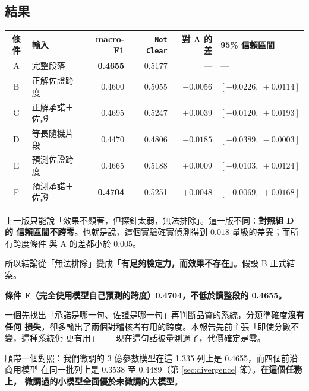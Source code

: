 \documentclass[11pt,a4paper]{ctexart}
\newcommand{\fn}[1]{\texttt{#1}}
\begin{document}
\subsection{結果}

\begin{table}[h]
\centering\small
\begin{tabular}{@{}clrrrl@{}}
\toprule
條件 & 輸入 & macro-F1 & \fn{Not Clear} & 對 A 的差 & 95\% 信賴區間 \\
\midrule
A & 完整段落 & \textbf{0.4655} & 0.5177 & — & — \\
B & 正解佐證跨度 & 0.4600 & 0.5055 & $-0.0056$ & $[-0.0226,\ +0.0114]$ \\
C & 正解承諾＋佐證 & 0.4695 & 0.5247 & $+0.0039$ & $[-0.0120,\ +0.0193]$ \\
\rowcolor{yellow!15}
D & 等長隨機片段 & 0.4470 & 0.4806 & $\mathbf{-0.0185}$ & $\mathbf{[-0.0389,\ -0.0003]}$ \\
E & 預測佐證跨度 & 0.4665 & 0.5188 & $+0.0009$ & $[-0.0103,\ +0.0124]$ \\
\rowcolor{green!12}
F & 預測承諾＋佐證 & \textbf{0.4704} & 0.5251 & $+0.0048$ & $[-0.0069,\ +0.0168]$ \\
\bottomrule
\end{tabular}
\end{table}

\begin{tcolorbox}[colback=green!5, colframe=green!45, title=這次的結論比上次強，因為這次有檢定力]
上一版只能說「效果不顯著，但探針太弱，無法排除」。這一版不同：\textbf{對照組 D 的
信賴區間不跨零}。也就是說，這個實驗確實偵測得到 $0.018$ 量級的差異；而所有跨度條件
與 A 的差都小於 $0.005$。

\medskip
所以結論從「無法排除」變成\textbf{「有足夠檢定力，而效果不存在」}。假設 B 正式結案。
\end{tcolorbox}

\begin{tcolorbox}[colback=blue!5, colframe=blue!50, title=但有一個正面的副產物]
\textbf{條件 F（完全使用模型自己預測的跨度）0.4704，不低於讀整段的 0.4655。}

\medskip
一個先找出「承諾是哪一句、佐證是哪一句」再判斷品質的系統，分類準確度\textbf{沒有任何
損失}，卻多輸出了兩個對稽核者有用的跨度。本報告先前主張「即使分數不變，這種系統仍
更有用」——現在這句話被量測過了，代價確定是零。
\end{tcolorbox}

順帶一個對照：我們微調的 3 億參數模型在這 1{,}335 列上是 0.4655，而四個前沿商用模型
在同一批列上是 0.3538 至 0.4489（第 \ref{sec:divergence} 節）。\textbf{在這個任務上，
微調過的小模型全面優於未微調的大模型}。
\end{document}
